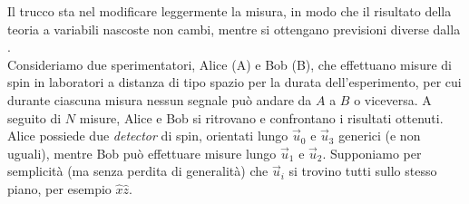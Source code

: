 \documentclass[../../FisicaTeorica.tex]{subfiles}
\begin{document}
Il trucco sta nel modificare leggermente la misura, in modo che il risultato della teoria a variabili nascoste non cambi, mentre si ottengano previsioni diverse dalla \MQ.\\

Consideriamo due sperimentatori, Alice (A) e Bob (B), che effettuano misure di spin in laboratori a distanza di tipo spazio per la durata dell'esperimento, per cui durante ciascuna misura nessun segnale può andare da $A$ a $B$ o viceversa. A seguito di $N$ misure, Alice e Bob si ritrovano e confrontano i risultati ottenuti.\\

Alice possiede due \textit{detector} di spin, orientati lungo $\vec{u}_0$ e $\vec{u}_3$ generici (e non uguali), mentre Bob può effettuare misure lungo $\vec{u}_1$ e $\vec{u}_2$. Supponiamo per semplicità (ma senza perdita di generalità) che $\vec{u}_i$ si trovino tutti sullo stesso piano, per esempio $\hat{x}\hat{z}$.\\
\end{document}
